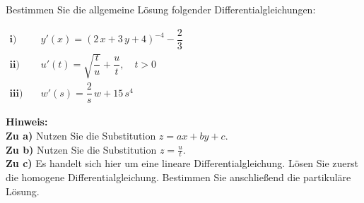 {
Bestimmen Sie die allgemeine Lösung folgender Differentialgleichungen: 
\begin{flushleft}
\begin{math}
\begin{aligned}
\mathbf{i)}\quad & y'(x)=(2\,x+3\,y+4)^{-4}-\dfrac{2}{3} \\
\mathbf{ii)}\quad & u'(t)=\sqrt{\dfrac{t}{u}}+\dfrac{u}{t},\quad t>0 \\
\mathbf{iii)}\quad & w'(s)=\dfrac{2}{s}\,w+15\,s^4 
\end{aligned}
\end{math}
\end{flushleft}

\begin{flushleft}
\textbf{Hinweis:} \\
\textbf{Zu a)} Nutzen Sie die Substitution $z = ax + by +c$. \\
\textbf{Zu b)} Nutzen Sie die Substitution $z=\frac{u}{t}$. \\
\textbf{Zu c)} Es handelt sich hier um eine lineare Differentialgleichung. Lösen Sie zuerst
				 die homogene Differentialgleichung. Bestimmen Sie anschließend
				  die partikuläre Lösung.
\end{flushleft}
}


